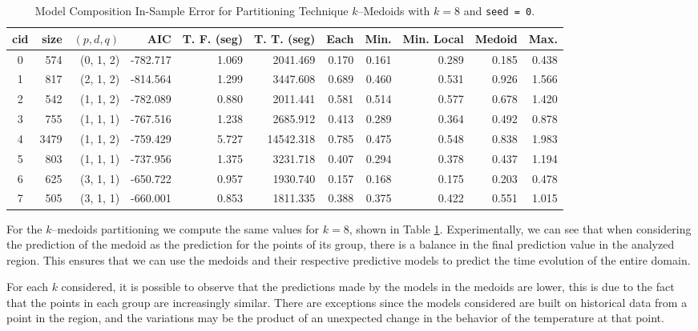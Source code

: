 \begin{table}[h]
	\centering
	\tiny
	\begin{tabular}{|c|r|r|r|r|r|r|r|r|r|r|}
		\hline
		cid & size & $(p, d, q)$ & AIC & T. F. (seg) & T. T. (seg) & Each & Min. & Min. Local & Medoid & Max. \\
		\hline
		0 &  574 & (0, 1, 2) & -782.717 & 1.069	&  2041.469	& 0.170	& 0.161	& 0.289	& 0.185	& 0.438	 \\
		1 &  817 & (2, 1, 2) & -814.564 & 1.299	&  3447.608	& 0.689	& 0.460	& 0.531	& 0.926	& 1.566	 \\
		2 &  542 & (1, 1, 2) & -782.089 & 0.880	&  2011.441	& 0.581	& 0.514	& 0.577	& 0.678	& 1.420	 \\
		3 &  755 & (1, 1, 1) & -767.516 & 1.238	&  2685.912	& 0.413	& 0.289	& 0.364	& 0.492	& 0.878	 \\
		4 & 3479 & (1, 1, 2) & -759.429 & 5.727	& 14542.318	& 0.785	& 0.475	& 0.548	& 0.838	& 1.983	 \\
		5 &  803 & (1, 1, 1) & -737.956 & 1.375	&  3231.718	& 0.407	& 0.294	& 0.378	& 0.437	& 1.194	 \\
		6 &  625 & (3, 1, 1) & -650.722 & 0.957	&  1930.740	& 0.157	& 0.168	& 0.175	& 0.203	& 0.478	 \\
		7 &  505 & (3, 1, 1) & -660.001 & 0.853	&  1811.335	& 0.388	& 0.375	& 0.422	& 0.551	& 1.015	 \\ \hline	
	\end{tabular}
	\caption{Model Composition In-Sample Error for Partitioning Technique  $k$--Medoids with $k=8$ and \texttt{seed = 0}.}
	\label{Table:ForecastErrorkMedoidsk8}
\end{table}
For the $k$--medoids partitioning we compute the same values for $k=8$, shown in Table \ref{Table:ForecastErrorkMedoidsk8}. Experimentally, we can see that when considering the prediction of the medoid as the prediction for the points of its group, there is a balance in the final prediction value in the analyzed region. This ensures that we can use the medoids and their respective predictive models to predict the time evolution of the entire domain.

For each $k$ considered, it is possible to observe that the predictions made by the models in the medoids are lower, this is due to the fact that the points in each group are increasingly similar. There are exceptions since the models considered are built on historical data from a point in the region, and the variations may be the product of an unexpected change in the behavior of the temperature at that point.

